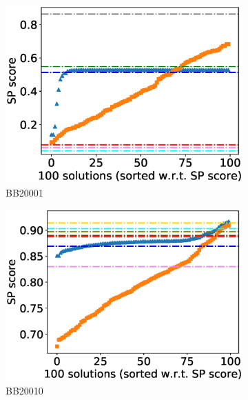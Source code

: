 \begin{figure}[!htbp]
	\centering
	\begin{adjustwidth}{-1cm}{-1cm}
		\begin{subfigure}{0.22\textwidth}
			\includegraphics[width=\columnwidth]{Figure/summary/precomputedInit/Balibase/BB20001_pairs_density_single_run_2}
			\caption{BB20001}
		\end{subfigure}	
		\begin{subfigure}{0.22\textwidth}
			\includegraphics[width=\columnwidth]{Figure/summary/precomputedInit/Balibase/BB20010_pairs_density_single_run_2}
			\caption{BB20010}
		\end{subfigure}
		\begin{subfigure}{0.22\textwidth}

\end{subfigure}
\end{adjustwidth}
\end{figure}
